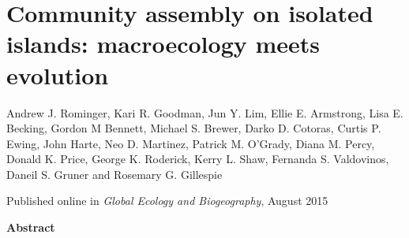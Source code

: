 \chapter{Community assembly on isolated islands: macroecology meets
  evolution}

{\large Andrew J. Rominger, Kari R. Goodman, Jun Y. Lim, Ellie
  E. Armstrong, Lisa E. Becking, Gordon M Bennett, Michael S. Brewer,
  Darko D. Cotoras, Curtis P. Ewing, John Harte, Neo D. Martinez,
  Patrick M. O'Grady, Diana M. Percy, Donald K. Price, George
  K. Roderick, Kerry L. Shaw, Fernanda S. Valdovinos, Daneil S. Gruner
  and Rosemary G. Gillespie}
\vspace{3.5em}

\noindent
Published online in \textit{Global Ecology and Biogeography}, August 2015

\clearpage

\noindent
\textbf{Abstract}
\vspace{\baselineskip}

